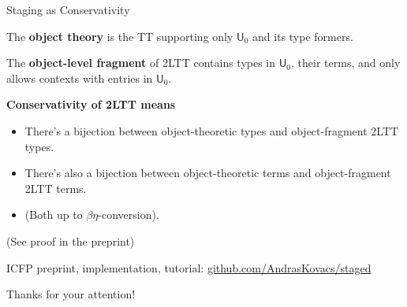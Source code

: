 \documentclass[dvipsnames,aspectratio=169]{beamer}
\newcommand{\msf}[1]{\mathsf{#1}}
\newcommand{\U}{\msf{U}}
\theoremstyle{remark}
\begin{document}
\begin{frame}{Staging as Conservativity}

The \textbf{object theory} is the TT supporting only $\U_0$ and its type formers.
\vspace{1em}
\pause

The \textbf{object-level fragment} of 2LTT contains types in $\U_0$, their terms,
and only allows contexts with entries in $\U_0$.
\vspace{1em}
\pause

\textbf{Conservativity of 2LTT means}
\begin{itemize}
  \item There's a bijection between object-theoretic types and object-fragment 2LTT types.
  \item There's also a bijection between object-theoretic terms and object-fragment 2LTT terms.
  \item (Both up to $\beta\eta$-conversion).
\end{itemize}
\vspace{1em}

(See proof in the preprint)


\end{frame}




\begin{frame}{}

ICFP preprint, implementation, tutorial: \url{github.com/AndrasKovacs/staged}
\vspace{2em}

\begin{center}
  \Large {Thanks for your attention!}
\end{center}


\end{frame}
\end{document}
